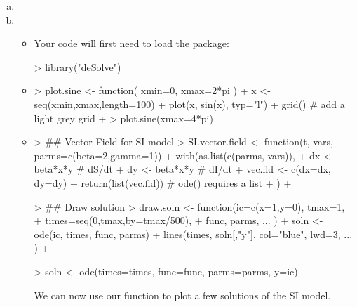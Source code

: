\documentclass[12pt]{article}
\begin{document}
\begin{enumerate}[(a)]

\item \FitSIRa

\item \FitSIRbIntro
\begin{itemize}
    \item Your code will first need to load the  package:
\begin{Schunk}
\begin{Sinput}
> library("deSolve")
\end{Sinput}
\end{Schunk}
    \item \FitSIRbii
\begin{Schunk}
\begin{Sinput}
> plot.sine <- function( xmin=0, xmax=2*pi ) {
+   x <- seq(xmin,xmax,length=100)
+   plot(x, sin(x), typ="l")
+   grid() # add a light grey grid
+ }
> plot.sine(xmax=4*pi)
\end{Sinput}
\end{Schunk}
  \item \FitSIRbiiiA
\begin{Schunk}
\begin{Sinput}
> ## Vector Field for SI model
> SI.vector.field <- function(t, vars, parms=c(beta=2,gamma=1)) {
+   with(as.list(c(parms, vars)), {
+     dx <- -beta*x*y # dS/dt
+     dy <- beta*x*y  # dI/dt
+     vec.fld <- c(dx=dx, dy=dy)
+     return(list(vec.fld)) # ode() requires a list
+   })
+ }
\end{Sinput}
\end{Schunk}

\FitSIRbiiiB
\begin{Schunk}
\begin{Sinput}
> ## Draw solution
> draw.soln <- function(ic=c(x=1,y=0), tmax=1, 
+                       times=seq(0,tmax,by=tmax/500), 
+                       func, parms, ... ) {
+   soln <- ode(ic, times, func, parms)
+   lines(times, soln[,"y"], col="blue", lwd=3, ... )
+ }
\end{Sinput}
\end{Schunk}
\FitSIRbiiiC
\begin{Schunk}
\begin{Sinput}
>   soln <- ode(times=times, func=func, parms=parms, y=ic)
\end{Sinput}
\end{Schunk}

We can now use our  function to plot a few solutions of the SI model.


\end{itemize}
\end{enumerate}
\end{document}

